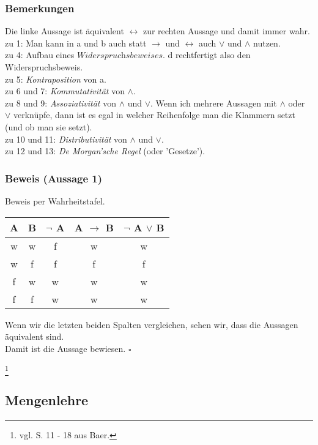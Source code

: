 \documentclass{article}
\begin{document}
\subsubsection*{Bemerkungen}
Die linke Aussage ist äquivalent $\leftrightarrow$ zur rechten Aussage und damit immer wahr. \\
zu 1: Man kann in a und b auch statt $\rightarrow$ und $\leftrightarrow$ auch $\vee$ und $\wedge$ nutzen. \\
zu 4: Aufbau eines $\textit{Widerspruchsbeweises}$. d rechtfertigt also den Widerspruchsbeweis. \\
zu 5: \textit{Kontraposition} von a. \\
zu 6 und 7: \textit{Kommutativität} von $\wedge$. \\
zu 8 und 9: \textit{Assoziativität} von $\wedge$ und $\vee$. Wenn ich mehrere Aussagen mit $\wedge$ oder $\vee$ verknüpfe, dann ist es egal in welcher Reihenfolge man die Klammern setzt (und ob man sie setzt). \\
zu 10 und 11: \textit{Distributivität} von $\wedge$ und $\vee$. \\
zu 12 und 13: \textit{De Morgan'sche Regel} (oder 'Gesetze'). 

\subsubsection*{Beweis (Aussage 1)}
Beweis per Wahrheitstafel. \\
\begin{center}
    \begin{tabular}{|c|c|c|c|c|}
        \hline
        A & B & $\neg$ A & A $\rightarrow$ B & $\neg$ A $\vee$ B \\
        \hline
        \hline
        w & w & f & w & w \\
        w & f & f & f & f \\
        f & w & w & w & w \\
        f & f & w & w & w \\
        \hline
    \end{tabular}
\end{center}

Wenn wir die letzten beiden Spalten vergleichen, sehen wir, dass die Aussagen äquivalent sind. \\
Damit ist die Aussage bewiesen. $\square$ 


\date{Donnerstag, 19.10.23} \footnote{vgl. S. 11 - 18 aus Baer.}

\subsection{Mengenlehre}
\end{document}
